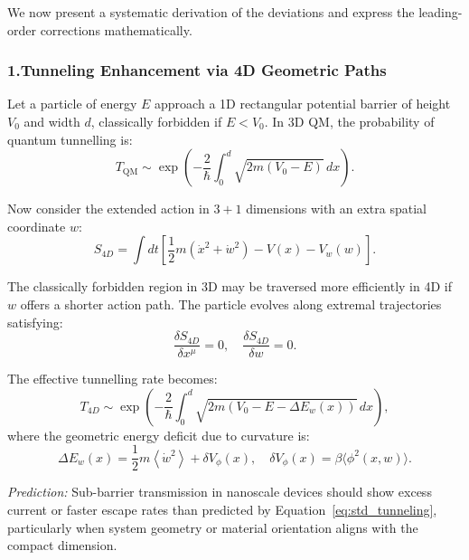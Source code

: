 \documentclass[12pt]{article}
\begin{document}
We now present a systematic derivation of the deviations and express the leading-order corrections mathematically.

\subsubsection*{1.Tunneling Enhancement via 4D Geometric Paths}

Let a particle of energy \(E\) approach a 1D rectangular potential barrier of height \(V_0\) and width \(d\), classically forbidden if \(E < V_0\). In 3D QM, the probability of quantum tunnelling is:
\begin{equation}
T_{\mathrm{QM}} \sim \exp\left( -\frac{2}{\hbar} \int_0^d \sqrt{2m (V_0 - E)} \, dx \right).
\label{eq:std_tunneling}
\end{equation}

Now consider the extended action in \(3+1\) dimensions with an extra spatial coordinate \(w\):
\begin{equation}
S_{4D} = \int dt \left[ \frac{1}{2} m \left( \dot{x}^2 + \dot{w}^2 \right) - V(x) - V_w(w) \right].
\label{eq:4D_action}
\end{equation}

The classically forbidden region in 3D may be traversed more efficiently in 4D if \(w\) offers a shorter action path. The particle evolves along extremal trajectories satisfying:
\begin{equation}
\frac{\delta S_{4D}}{\delta x^\mu} = 0, \quad \frac{\delta S_{4D}}{\delta w} = 0.
\end{equation}

The effective tunnelling rate becomes:
\begin{equation}
T_{4D} \sim \exp\left( -\frac{2}{\hbar} \int_0^d \sqrt{2m (V_0 - E - \Delta E_w(x))} \, dx \right),
\label{eq:enhanced_tunneling}
\end{equation}
where the geometric energy deficit due to curvature is:
\begin{equation}
\Delta E_w(x) = \frac{1}{2} m \left\langle \dot{w}^2 \right\rangle + \delta V_\phi(x),
\quad \delta V_\phi(x) = \beta \langle \phi^2(x, w) \rangle.
\end{equation}

\emph{Prediction:} Sub-barrier transmission in nanoscale devices should show excess current or faster escape rates than predicted by Equation~\eqref{eq:std_tunneling}, particularly when system geometry or material orientation aligns with the compact dimension.
\end{document}
